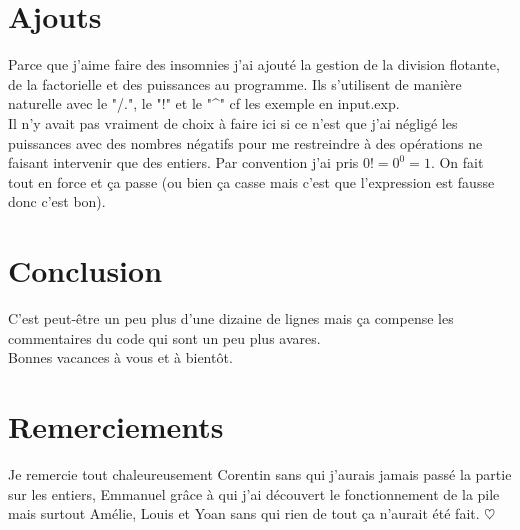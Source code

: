\documentclass{article}
\begin{document}
\section{Ajouts}
Parce que j'aime faire des insomnies j'ai ajouté la gestion de la division flotante, de la factorielle et des puissances au programme. Ils s'utilisent de manière naturelle avec le "/.", le "!" et le "\^{}" cf les exemple en input.exp. %
\\
Il n'y avait pas vraiment de choix à faire ici si ce n'est que j'ai négligé les puissances avec des nombres négatifs pour me restreindre à des opérations ne faisant intervenir que des entiers. Par convention j'ai pris $0! = 0 ^ 0 = 1$. On fait tout en force et ça passe (ou bien ça casse mais c'est que l'expression est fausse donc c'est bon).\\

\section{Conclusion}
C'est peut-être un peu plus d'une dizaine de lignes mais ça compense les commentaires du code qui sont un peu plus avares.\\
Bonnes vacances à vous et à bientôt.\\

\section{Remerciements}
Je remercie tout chaleureusement Corentin sans qui j'aurais jamais passé la partie sur les entiers, Emmanuel grâce à qui j'ai découvert le fonctionnement de la pile mais surtout Amélie, Louis et Yoan sans qui rien de tout ça n'aurait été fait. $\heartsuit$
\end{document}
